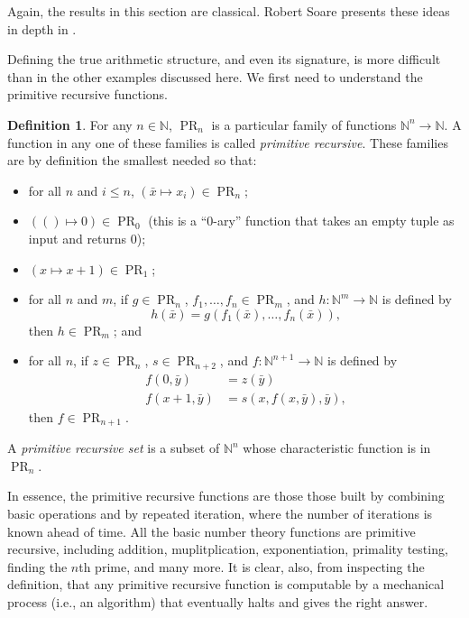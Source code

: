 \documentclass{article}
\theoremstyle{plain}
\theoremstyle{definition}
\newtheorem{defn}[thm]{Definition}
\newcommand{\defterm}{\emph}
\newcommand{\tuple}{\bar}
\DeclareMathOperator{\PR}{PR}
\begin{document}
Again, the results in this section are classical. Robert Soare
presents these ideas in depth in \cite{soare}.

Defining the true arithmetic structure, and even its signature, is
more difficult than in the other examples discussed here. We first
need to understand the primitive recursive functions.

\begin{defn}\label{defn:primrec}
  For any $n \in \mathbb{N}$, $\PR_n$ is a particular family of
  functions $\mathbb{N}^n \to \mathbb{N}$. A function in any one of
  these families is called \defterm{primitive recursive}. These
  families are by definition the smallest needed so that:
  \begin{itemize}
  \item for all $n$ and $i \leq n$, $\left(\tuple{x} \mapsto x_i\right) \in \PR_n$;
  \item $\left(() \mapsto 0\right) \in \PR_0$ (this is a ``0-ary''
    function that takes an empty tuple as input and returns 0);
  \item $\left(x \mapsto x + 1\right) \in \PR_1$;
  \item for all $n$ and $m$, if $g \in \PR_n$, $f_1,\ldots,f_n \in
    \PR_m$, and $h : \mathbb{N}^m \to \mathbb{N}$ is defined
    by $$h(\tuple{x}) =
    g(f_1(\tuple{x}),\ldots,f_n(\tuple{x}))\text{,}$$ then $h \in
    \PR_m$; and
  \item for all $n$, if $z \in \PR_n$, $s \in \PR_{n+2}$, and $f :
    \mathbb{N}^{n+1} \to \mathbb{N}$ is defined by
    \begin{align*}
      f(0,\tuple{y}) &= z(\tuple{y}) \\
      f(x+1,\tuple{y}) &= s(x,f(x,\tuple{y}),\tuple{y}) \text{,}
    \end{align*}
    then $f \in \PR_{n+1}$.
  \end{itemize}

  A \defterm{primitive recursive set} is a subset of $\mathbb{N}^n$
  whose characteristic function is in $\PR_n$.
\end{defn}

In essence, the primitive recursive functions are those those built by
combining basic operations and by repeated iteration, where the number
of iterations is known ahead of time. All the basic number theory
functions are primitive recursive, including addition,
muplitplication, exponentiation, primality testing, finding the $n$th
prime, and many more. It is clear, also, from inspecting the
definition, that any primitive recursive function is computable by a
mechanical process (i.e., an algorithm) that eventually halts and
gives the right answer.
\end{document}
